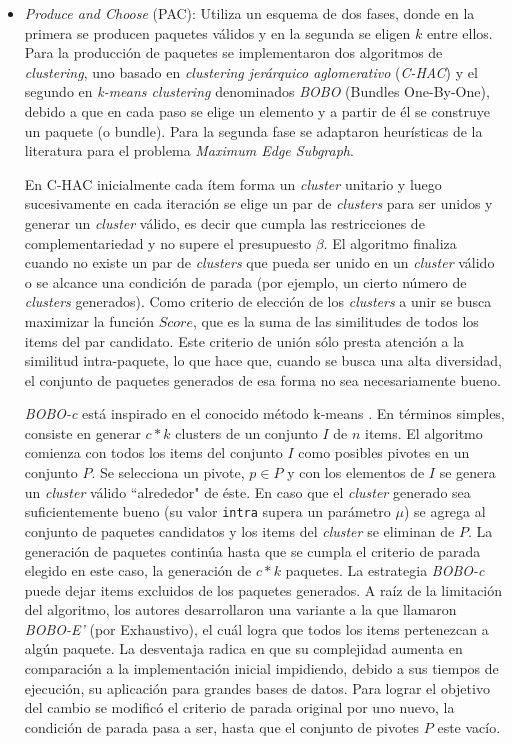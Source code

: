 \begin{itemize}

	\item {\em Produce and Choose} (PAC): Utiliza un esquema de dos fases, donde en la primera se producen paquetes válidos y en la segunda se eligen $k$ entre ellos. Para la producción de paquetes se implementaron dos algoritmos de {\em clustering}, uno basado en {\em clustering jerárquico aglomerativo} (\textit{C-HAC}) y el segundo en {\em k-means clustering} denominados \textit{BOBO} (Bundles One-By-One), debido a que en cada paso se elige un elemento y a partir de él se construye un paquete (o bundle). Para la segunda fase se adaptaron heurísticas de la literatura para el problema {\em Maximum Edge Subgraph}.

En C-HAC inicialmente cada ítem forma un {\em cluster} unitario y luego sucesivamente en cada iteración se elige un par de {\em clusters} para ser unidos y generar un {\em cluster} válido, es decir que cumpla las restricciones de complementariedad y no supere el presupuesto $\beta$. El algoritmo finaliza cuando no existe un par de {\em clusters} que pueda ser unido en un {\em cluster} válido o se alcance una condición de parada (por ejemplo, un cierto número de {\em clusters} generados). Como criterio de elección de los {\em clusters} a unir se busca maximizar la función $Score$, que es la suma de las similitudes de todos los items del par candidato. Este criterio de unión sólo presta atención a la similitud intra-paquete, lo que hace que, cuando se busca una alta diversidad, el conjunto de paquetes generados de esa forma no sea necesariamente bueno.

{\em BOBO-c} está inspirado en el conocido método k-means \cite{forgy65}. En términos simples, consiste en generar $c*k$ clusters de un conjunto $I$ de $n$ items. El algoritmo comienza con todos los items del conjunto $I$ como posibles pivotes en un conjunto $P$. Se selecciona un pivote, $p \in P$ y con los elementos de $I$ se genera un {\em cluster} válido ``alrededor" de éste. En caso que el {\em cluster} generado sea suficientemente bueno (su valor \texttt{intra} supera un parámetro $\mu$) se agrega al conjunto de paquetes candidatos y los items del {\em cluster} se eliminan de $P$. La generación de paquetes continúa hasta que se cumpla el criterio de parada elegido en este caso, la generación de $c*k$ paquetes. La estrategia \textit{BOBO-c} puede dejar items excluidos de los paquetes generados. A raíz de la limitación del algoritmo, los autores desarrollaron una variante a la que llamaron \textit{BOBO-E'} (por Exhaustivo), el cuál logra que todos los items pertenezcan a algún paquete. La desventaja radica en que su complejidad aumenta en comparación a la implementación inicial impidiendo, debido a sus tiempos de ejecución, su aplicación para grandes bases de datos. Para lograr el objetivo del cambio se modificó el criterio de parada original por uno nuevo, la condición de parada pasa a ser, hasta que el conjunto de pivotes $P$ este vacío.


\end{itemize}
